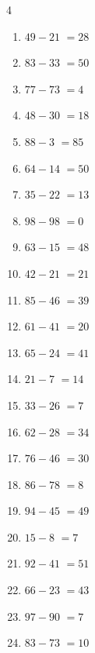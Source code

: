 \begin{multicols}{4}
\begin{enumerate}
  \item $49-21$
        $=28$

  \item $83-33$
        $=50$

  \item $77-73$
        $=4$

  \item $48-30$
        $=18$

  \item $88-3$
        $=85$

  \item $64-14$
        $=50$

  \item $35-22$
        $=13$

  \item $98-98$
        $=0$

  \item $63-15$
        $=48$

  \item $42-21$
        $=21$

  \item $85-46$
        $=39$

  \item $61-41$
        $=20$

  \item $65-24$
        $=41$

  \item $21-7$
        $=14$

  \item $33-26$
        $=7$

  \item $62-28$
        $=34$

  \item $76-46$
        $=30$

  \item $86-78$
        $=8$

  \item $94-45$
        $=49$

  \item $15-8$
        $=7$

  \item $92-41$
        $=51$

  \item $66-23$
        $=43$

  \item $97-90$
        $=7$

  \item $83-73$
        $=10$


\end{enumerate}
\end{multicols}
